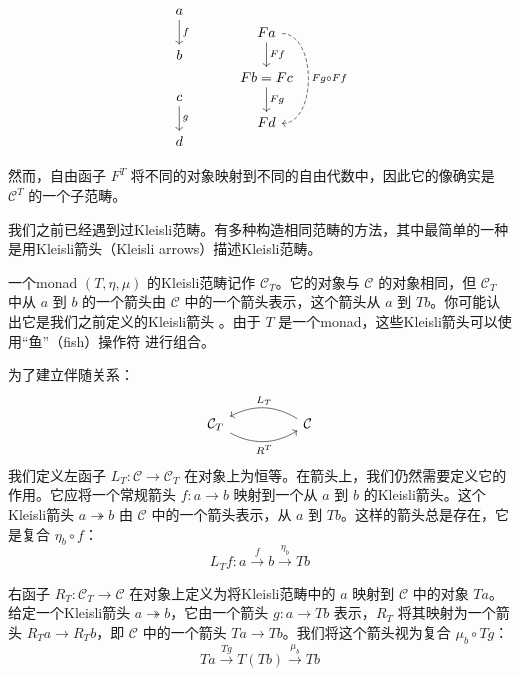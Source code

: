 \documentclass[DaoFP]{subfiles}
\begin{document}
    \[
        \begin{tikzcd}
            a
            \arrow[d, "f"]
            \\ b
            \\ c
            \arrow[d, "g"]
            \\ d
        \end{tikzcd}
        \hspace{30pt}
        \begin{tikzcd}
            F a
            \arrow[d, "F f"]
            \arrow[dd, dashed, bend left=90, "F g \circ F f"]
            \\ F b = F c
            \arrow[d, "F g"]
            \\ F d
        \end{tikzcd}
    \]

    然而，自由函子 $F^T$ 将不同的对象映射到不同的自由代数中，因此它的像确实是 $\mathcal{C}^T$ 的一个子范畴。

    我们之前已经遇到过Kleisli范畴。有多种构造相同范畴的方法，其中最简单的一种是用Kleisli箭头（Kleisli arrows）描述Kleisli范畴。

    一个monad $(T, \eta, \mu)$ 的Kleisli范畴记作 $\mathcal{C}_T$。它的对象与 $\mathcal{C}$ 的对象相同，但 $\mathcal{C}_T$ 中从 $a$ 到 $b$ 的一个箭头由 $\mathcal{C}$ 中的一个箭头表示，这个箭头从 $a$ 到 $T b$。你可能认出它是我们之前定义的Kleisli箭头 。由于 $T$ 是一个monad，这些Kleisli箭头可以使用“鱼”（fish）操作符 \hask{<=<} 进行组合。

    为了建立伴随关系：
    \[
        \begin{tikzcd}
            \mathcal{C}_T
            \arrow[rr, bend right, "R^T"']
            &&
            \mathcal{C}
            \arrow[ll, bend right, "L_T"']
        \end{tikzcd}
    \]
    我们定义左函子 $L_T \colon \mathcal{C} \to \mathcal{C}_T$ 在对象上为恒等。在箭头上，我们仍然需要定义它的作用。它应将一个常规箭头 $f \colon a \to b$ 映射到一个从 $a$ 到 $b$ 的Kleisli箭头。这个Kleisli箭头 $a \twoheadrightarrow b$ 由 $\mathcal{C}$ 中的一个箭头表示，从 $a$ 到 $T b$。这样的箭头总是存在，它是复合 $\eta_b \circ f$：
    \[ L_T f \colon a \xrightarrow{f} b \xrightarrow{\eta_b} T b\]

    右函子 $R_T \colon \mathcal{C}_T \to \mathcal{C}$ 在对象上定义为将Kleisli范畴中的 $a$ 映射到 $\mathcal{C}$ 中的对象 $T a$。给定一个Kleisli箭头 $a \twoheadrightarrow b$，它由一个箭头 $g \colon a \to T b$ 表示，$R_T$ 将其映射为一个箭头 $R_T a \to R_T b$，即 $\mathcal{C}$ 中的一个箭头 $T a \to T b$。我们将这个箭头视为复合 $\mu_b \circ T g$：
    \[  T a \xrightarrow{T g} T(T b) \xrightarrow{\mu_b} T b\]
\end{document}
